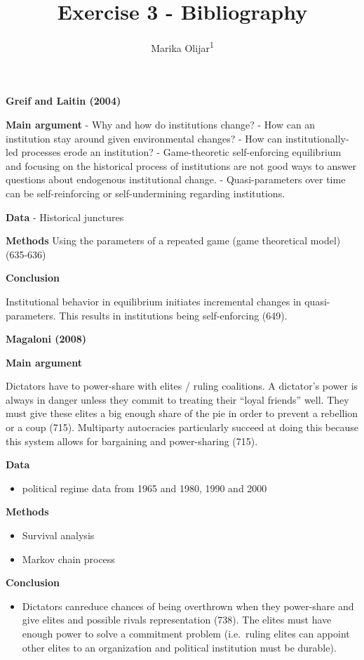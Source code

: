 \documentclass[
  english,
  man]{apa6}
\title{Exercise 3 - Bibliography}
\author{Marika Olijar\textsuperscript{1}}
\date{}
\affiliation{\vspace{0.5cm}\textsuperscript{1} University of Wisconsin-Madison}
\providecommand{\tightlist}{%
  \setlength{\itemsep}{0pt}\setlength{\parskip}{0pt}}
\begin{document}
\maketitle

\textbf{Greif and Laitin (2004)}

\textbf{Main argument}
- Why and how do institutions change?
- How can an institution stay around given environmental changes?
- How can institutionally-led processes erode an institution?
- Game-theoretic self-enforcing equilibrium and focusing on the historical process of institutions are not good ways to answer questions about endogenous institutional change.
- Quasi-parameters over time can be self-reinforcing or self-undermining regarding institutions.

\textbf{Data}
- Historical junctures

\textbf{Methods}
Using the parameters of a repeated game (game theoretical model) (635-636)

\textbf{Conclusion}

Institutional behavior in equilibrium initiates incremental changes in quasi-parameters. This results in institutions being self-enforcing (649).

\textbf{Magaloni (2008)}

\textbf{Main argument}

Dictators have to power-share with elites / ruling coalitions. A dictator's power is always in danger unless they commit to treating their ``loyal friends'' well. They must give these elites a big enough share of the pie in order to prevent a rebellion or a coup (715). Multiparty autocracies particularly succeed at doing this because this system allows for bargaining and power-sharing (715).

\textbf{Data}

\begin{itemize}
\tightlist
\item
  political regime data from 1965 and 1980, 1990 and 2000
\end{itemize}

\textbf{Methods}

\begin{itemize}
\tightlist
\item
  Survival analysis
\item
  Markov chain process
\end{itemize}

\textbf{Conclusion}

\begin{itemize}
\tightlist
\item
  Dictators canreduce chances of being overthrown when they power-share and give elites and possible rivals representation (738). The elites must have enough power to solve a commitment problem (i.e.~ruling elites can appoint other elites to an organization and political institution must be durable).
\end{itemize}
\end{document}
